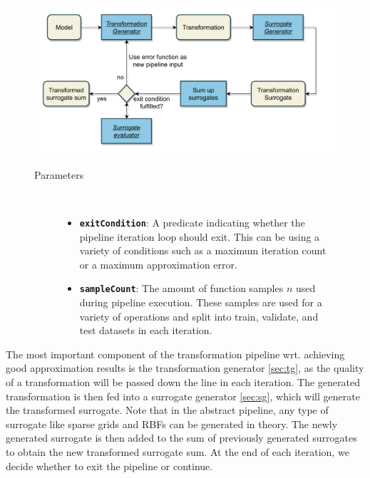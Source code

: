 \documentclass[
  a4paper,  %
  twoside,  %
  bibliography=totoc,
  headsepline,
  cleardoublepage=empty,
  parskip=half,
  draft=false
]{scrbook}
\begin{document}
\begin{mdframed}[style=style,frametitle={Transformation Pipeline}]
\begin{figure}[H]

\includegraphics[width=\textwidth]{graphics/TransformationPipeline.pdf}
\vspace{-7.5mm}

\delimit

\begin{description}
\item[Parameters] {~ \begin{itemize}[\indent{}]
\item \texttt{\textbf{exitCondition}}: A predicate indicating whether the pipeline iteration loop should exit. This can be using a variety of conditions such as a maximum iteration count or a maximum approximation error.
\item \texttt{\textbf{sampleCount}}: The amount of function samples $n$ used during pipeline execution. These samples are used for a variety of operations and split into train, validate, and test datasets in each iteration.
\end{itemize}}
\end{description}

\delimit

\label{fig:tp}
\end{figure}
\end{mdframed}

The most important component of the transformation pipeline wrt. achieving good approximation results is the transformation generator \cref{sec:tg}, as the quality of a transformation will be passed down the line in each iteration.
The generated transformation is then fed into a surrogate generator \cref{sec:sg}, which will generate the transformed surrogate.
Note that in the abstract pipeline, any type of surrogate like sparse grids and RBFs can be generated in theory.
The newly generated surrogate is then added to the sum of previously generated surrogates to obtain the new transformed surrogate sum.
At the end of each iteration, we decide whether to exit the pipeline or continue.
\end{document}
